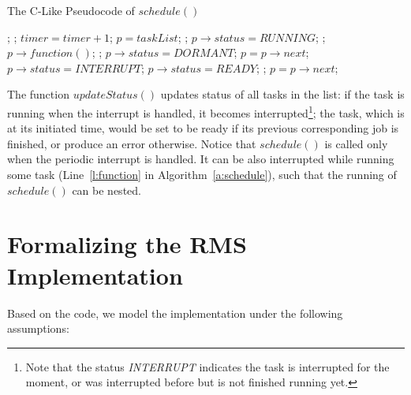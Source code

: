 \documentclass{llncs}
\begin{document}
\begin{algorithm}
  \caption{The C-Like Pseudocode of $schedule()$}
  \label{a:schedule}
  \begin{algorithmic}[1]
  \State {}; 
  \State {};
  \State $timer = timer + 1$; \label{l:timer}
  \State $p = taskList$;
      \State \Return;
      \State $p\rightarrow status = \textit{RUNNING}$;
      \State {}; 
      \State $p\rightarrow function()$;  \label{l:function}
      \State {};
      \State $p\rightarrow status = \textit{DORMANT}$;
    \EndIf
    \State $p = p\rightarrow next$;
  \EndWhile
\EndFunction
{}
     \label{l:startupdate}
      \State $p\rightarrow status = \textit{INTERRUPT}$;
    \EndIf
     
        \State $p\rightarrow status = \textit{READY}$;
      \Else {}
	\State {}; 
      \EndIf
    \EndIf \label{l:endupdate}
    \State $p = p\rightarrow next$;
  \EndWhile
\EndFunction
  \end{algorithmic}
\end{algorithm}

The function $updateStatus()$ updates status of all tasks in the list:
if the task is running when the interrupt is handled, it becomes
interrupted\footnote{Note that the status \textit{INTERRUPT} indicates
  the task is interrupted for the moment, or was interrupted before
  but is not finished running yet.}; the task, which is at its
initiated time, would be set to be ready if its previous corresponding
job is finished, or produce an error otherwise. Notice that
$schedule()$ is called only when the periodic interrupt is handled. It
can be also interrupted while running some task (Line~\ref{l:function}
in Algorithm~\ref{a:schedule}), such that the running of $schedule()$
can be nested.

\section{Formalizing the RMS Implementation}
Based on the code, we model the implementation under the following
assumptions:
\end{document}

